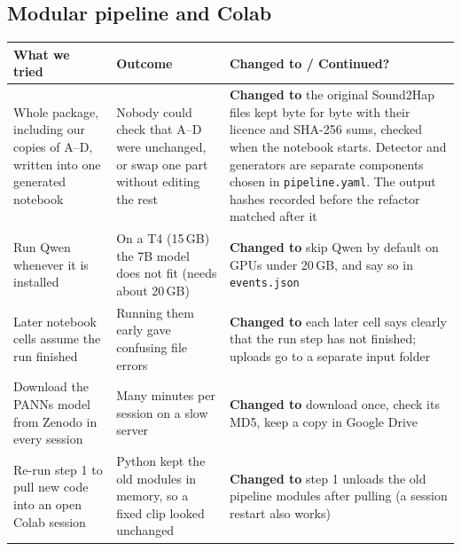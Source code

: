 \documentclass[11pt,a4paper]{article}
\begin{document}
\subsection*{Modular pipeline and Colab}
\begin{center}
\small
\begin{tabularx}{\textwidth}{@{}>{\raggedright\arraybackslash}p{4cm}>{\raggedright\arraybackslash}p{4cm}>{\raggedright\arraybackslash}X@{}}
\toprule
\textbf{What we tried} & \textbf{Outcome} & \textbf{Changed to / Continued?} \\
\midrule
Whole package, including our copies of A--D, written into one generated notebook & Nobody could check that A--D were unchanged, or swap one part without editing the rest & \textbf{Changed to} the original Sound2Hap files kept byte for byte with their licence and SHA-256 sums, checked when the notebook starts. Detector and generators are separate components chosen in \texttt{pipeline.yaml}. The output hashes recorded before the refactor matched after it \\
\addlinespace
Run Qwen whenever it is installed & On a T4 (15\,GB) the 7B model does not fit (needs about 20\,GB) & \textbf{Changed to} skip Qwen by default on GPUs under 20\,GB, and say so in \texttt{events.json} \\
\addlinespace
Later notebook cells assume the run finished & Running them early gave confusing file errors & \textbf{Changed to} each later cell says clearly that the run step has not finished; uploads go to a separate input folder \\
\addlinespace
Download the PANNs model from Zenodo in every session & Many minutes per session on a slow server & \textbf{Changed to} download once, check its MD5, keep a copy in Google Drive \\
\addlinespace
Re-run step 1 to pull new code into an open Colab session & Python kept the old modules in memory, so a fixed clip looked unchanged & \textbf{Changed to} step 1 unloads the old pipeline modules after pulling (a session restart also works) \\
\bottomrule
\end{tabularx}
\end{center}
\end{document}
